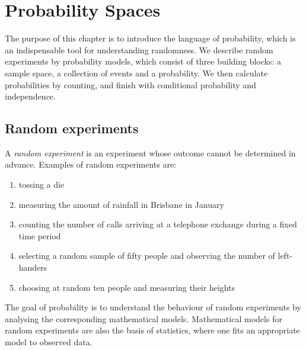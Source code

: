 \chapter{Probability Spaces}\label{ch:probability-spaces}



The purpose of this chapter is to introduce the language of probability, which is an indispensable tool for understanding randomness. We describe random experiments by probability models, which consist of three building blocks: a sample space, a collection of events and a probability. We then calculate probabilities by counting, and finish with conditional probability and independence.

\section{Random experiments}\label{sec:random-experiments}

A \emph{random experiment} is an experiment whose outcome cannot be determined in advance. Examples of random experiments are:
\begin{enumerate}
  \item tossing a die
  \item measuring the amount of rainfall in Brisbane in January
  \item counting the number of calls arriving at a telephone exchange during a fixed time period
  \item selecting a random sample of fifty people and observing the number of left-handers
  \item choosing at random ten people and measuring their heights
\end{enumerate}
The goal of probability is to understand the behaviour of random experiments by analysing the corresponding mathematical models. Mathematical models for random experiments are also the basis of statistics, where one fits an appropriate model to observed data.

